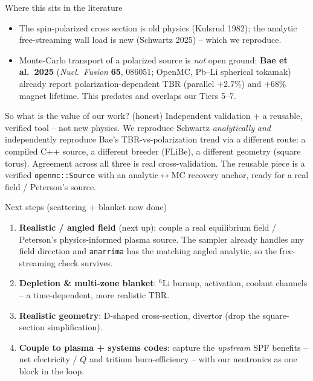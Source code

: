 \documentclass[aspectratio=169]{beamer}
\newcommand{\keyword}[1]{\textcolor{blue!60!black}{\textbf{#1}}}
\begin{document}
\begin{frame}{Where this sits in the literature}
  \begin{itemize}
    \item The spin-polarized cross section is \alert{old physics} (Kulsrud 1982); the \alert{analytic free-streaming wall load} is new (Schwartz 2025) -- which we reproduce.
    \item \alert{Monte-Carlo transport of a polarized source is \emph{not} open ground:} \keyword{Bae et al.\ 2025} (\emph{Nucl.\ Fusion} \textbf{65}, 086051; OpenMC, Pb--Li spherical tokamak) already report polarization-dependent TBR (parallel $+2.7\%$) and \alert{$+68\%$ magnet lifetime}. This \alert{predates and overlaps our Tiers 5--7}.
  \end{itemize}
  \vfill
  \begin{block}{So what is the value of our work? (honest)}
    \alert{Independent validation + a reusable, verified tool} -- not new physics. We reproduce Schwartz \emph{analytically} \emph{and} independently reproduce Bae's TBR-vs-polarization \alert{trend} via a different route: a compiled C++ source, a different breeder (FLiBe), a different geometry (square torus). Agreement across all three is real cross-validation. The reusable piece is a verified \texttt{openmc::Source} with an analytic$\leftrightarrow$MC recovery anchor, ready for a real field / Peterson's source.
  \end{block}
\end{frame}

\begin{frame}{Next steps (scattering + blanket now done)}
  \begin{enumerate}
    \item \keyword{Realistic / angled field} (next up): couple a real equilibrium field / \alert{Peterson's physics-informed plasma source}. The sampler already handles any field direction and \texttt{anarr\'ima} has the matching angled analytic, so the free-streaming check survives.
    \item \keyword{Depletion \& multi-zone blanket}: $^6$Li burnup, activation, coolant channels -- a time-dependent, more realistic TBR.
    \item \keyword{Realistic geometry}: D-shaped cross-section, divertor (drop the square-section simplification).
    \item \keyword{Couple to plasma + systems codes}: capture the \emph{upstream} SPF benefits -- net electricity / $Q$ and tritium burn-efficiency -- with our neutronics as one block in the loop.
  \end{enumerate}
\end{frame}
\end{document}
